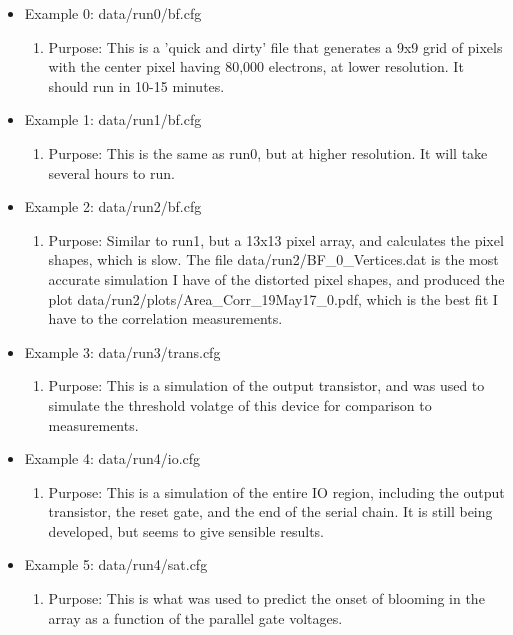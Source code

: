 \documentclass{article} %
\begin{document}
\begin{itemize}
  \item Example 0: data/run0/bf.cfg
    \begin{enumerate}
      \item Purpose: This is a 'quick and dirty' file that generates a 9x9 grid of pixels with the center pixel having 80,000 electrons, at lower resolution.  It should run in 10-15 minutes.
    \end{enumerate}

  \item Example 1: data/run1/bf.cfg
    \begin{enumerate}
      \item Purpose: This is the same as run0, but at higher resolution.  It will take several hours to run.
    \end{enumerate}

  \item Example 2: data/run2/bf.cfg
    \begin{enumerate}
      \item Purpose: Similar to run1, but a 13x13 pixel array, and calculates the pixel shapes, which is slow.  The file data/run2/BF\_0\_Vertices.dat is the most accurate simulation I have of the distorted pixel shapes, and produced the plot data/run2/plots/Area\_Corr\_19May17\_0.pdf, which is the best fit I have to the correlation measurements.
    \end{enumerate}

  \item Example 3: data/run3/trans.cfg
    \begin{enumerate}
      \item Purpose: This is a simulation of the output transistor, and was used to simulate the threshold volatge of this device for comparison to measurements.
    \end{enumerate}

  \item Example 4: data/run4/io.cfg
    \begin{enumerate}
      \item Purpose: This is a simulation of the entire IO region, including the output transistor, the reset gate, and the end of the serial chain.  It is still being developed, but seems to give sensible results.
    \end{enumerate}

  \item Example 5: data/run4/sat.cfg
    \begin{enumerate}
      \item Purpose: This is what was used to predict the onset of blooming in the array as a function of the parallel gate voltages.
    \end{enumerate}


\end{itemize}
\end{document}
